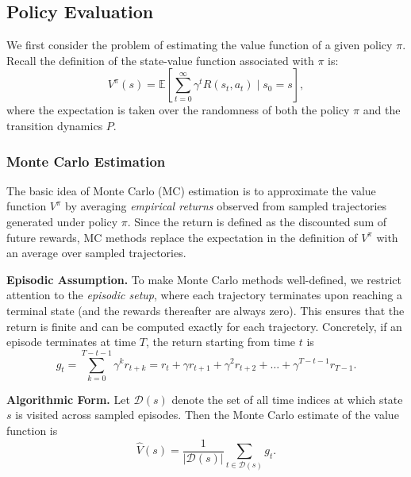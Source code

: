 \documentclass[
]{book}
\theoremstyle{definition}
\theoremstyle{definition}
\theoremstyle{definition}
\theoremstyle{definition}
\theoremstyle{remark}
\begin{document}
\subsection{Policy Evaluation}\label{policy-evaluation-2}

We first consider the problem of estimating the value function of a given policy \(\pi\). Recall the definition of the state-value function associated with \(\pi\) is:
\begin{equation}
V^{\pi}(s) = \mathbb{E}\left[ \sum_{t=0}^{\infty} \gamma^t R(s_t, a_t) \mid s_0 = s \right],
\label{eq:InfiniteHorizonStateValueRestate}
\end{equation}
where the expectation is taken over the randomness of both the policy \(\pi\) and the transition dynamics \(P\).

\subsubsection{Monte Carlo Estimation}\label{monte-carlo-estimation}

The basic idea of Monte Carlo (MC) estimation is to approximate the value function \(V^\pi\) by averaging \emph{empirical returns} observed from sampled trajectories generated under policy \(\pi\). Since the return is defined as the discounted sum of future rewards, MC methods replace the expectation in the definition of \(V^\pi\) with an average over sampled trajectories.

\textbf{Episodic Assumption.} To make Monte Carlo methods well-defined, we restrict attention to the \emph{episodic setup}, where each trajectory terminates upon reaching a terminal state (and the rewards thereafter are always zero). This ensures that the return is finite and can be computed exactly for each trajectory. Concretely, if an episode terminates at time \(T\), the return starting from time \(t\) is
\begin{equation}
g_t = \sum_{k=0}^{T-t-1} \gamma^k r_{t+k} = r_t + \gamma r_{t+1} + \gamma^2 r_{t+2} + \dots + \gamma^{T-t-1} r_{T-1}.
\label{eq:return-MC}
\end{equation}

\textbf{Algorithmic Form.} Let \(\mathcal{D}(s)\) denote the set of all time indices at which state \(s\) is visited across sampled episodes. Then the Monte Carlo estimate of the value function is
\begin{equation}
\hat{V}(s) = \frac{1}{|\mathcal{D}(s)|} \sum_{t \in \mathcal{D}(s)} g_t.
\label{eq:StateValueMCEstimate}
\end{equation}
\end{document}
